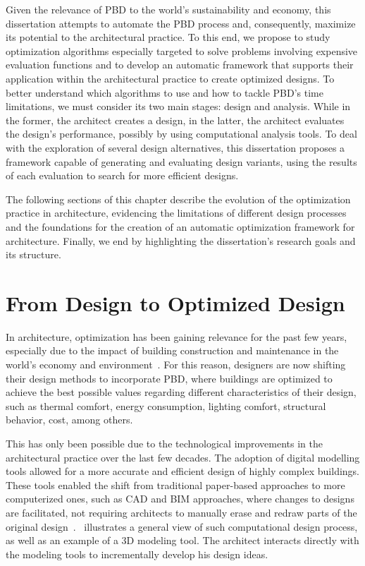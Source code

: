 	Given the relevance of \ac{PBD} to the world's sustainability and economy, this dissertation attempts to automate the \ac{PBD} process and, consequently, maximize its potential to the architectural practice. To this end, we propose to study optimization algorithms especially targeted to solve problems involving expensive evaluation functions and to develop an automatic framework that supports their application within the architectural practice to create optimized designs. To better understand which algorithms to use and how to tackle \ac{PBD}'s time limitations, we must consider its two main stages: design and analysis. While in the former, the architect creates a design, in the latter, the architect evaluates the design's performance, possibly by using computational analysis tools. To deal with the exploration of several design alternatives, this dissertation proposes a framework capable of generating and evaluating design variants, using the results of each evaluation to search for more efficient designs.
	
	The following sections of this chapter describe the evolution of the optimization practice in architecture, evidencing the limitations of different design processes and the foundations for the creation of an automatic optimization framework for architecture. Finally, we end by highlighting the dissertation's research goals and its structure.

\section{From Design to Optimized Design}
	
	In architecture, optimization has been gaining relevance for the past few years, especially due to the impact of building construction and maintenance in the world's economy and environment~\cite{Attia2013, Shi2016}. For this reason, designers are now shifting their design methods to incorporate \ac{PBD}, where buildings are optimized to achieve the best possible values regarding different characteristics of their design, such as thermal comfort, energy consumption, lighting comfort, structural behavior, cost, among others.

	This has only been possible due to the technological improvements in the architectural practice over the last few decades. The adoption of digital modelling tools allowed for a more accurate and efficient design of highly complex buildings. These tools enabled the shift from traditional paper-based approaches to more computerized ones, such as \ac{CAD} and \ac{BIM} approaches, where changes to designs are facilitated, not requiring architects to manually erase and redraw parts of the original design~\cite{Ferreira2015GD}.~ illustrates a general view of such computational design process, as well as an example of a 3D modeling tool. The architect interacts directly with the modeling tools to incrementally develop his design ideas.
	
